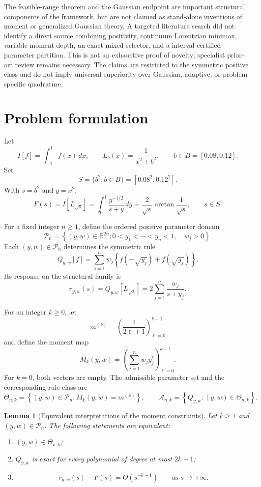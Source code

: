 \documentclass[preprint,12pt]{elsarticle}
\newtheorem{lemma}[theorem]{Lemma}
\theoremstyle{remark}
\begin{document}
The feasible-range theorem and the Gaussian endpoint are important
structural components of the framework, but are not claimed as
stand-alone inventions of moment or generalized Gaussian theory. A
targeted literature search did not identify a direct source combining
positivity, continuum Lorentzian minimax, variable moment depth, an exact
mixed selector, and a interval-certified parameter partition. This is not an
exhaustive proof of novelty; specialist prior-art review remains
necessary. The claims are restricted to the symmetric positive class
and do not imply universal superiority over Gaussian, adaptive, or
problem-specific quadrature.

\section{Problem formulation}

Let
\[
I[f]=\int_{-1}^{1} f(x)\,dx,
\qquad
L_b(x)=\frac{1}{x^2+b^2},
\qquad
b\in B=[0.08,0.12].
\]
Set
\[
S=\{b^2:b\in B\}=[0.08^2,0.12^2].
\]
With \(s=b^2\) and \(y=x^2\),
\[
F(s)=I[L_{\sqrt{s}}]
=\int_0^1\frac{y^{-1/2}}{s+y}\,dy
=\frac{2}{\sqrt{s}}\arctan\frac{1}{\sqrt{s}},
\qquad s\in S.
\]

For a fixed integer \(n\geq1\), define the ordered positive parameter
domain
\[
\mathcal P_n
=
\left\{
(y,w)\in\mathbb R^{2n}:
0<y_1<\cdots<y_n<1,\quad w_j>0
\right\}.
\]
Each \((y,w)\in\mathcal P_n\) determines the symmetric rule
\[
Q_{y,w}[f]
=
\sum_{j=1}^{n}w_j
\left\{
f(-\sqrt{y_j})+f(\sqrt{y_j})
\right\}.
\]
Its response on the structural family is
\[
r_{y,w}(s)
=
Q_{y,w}[L_{\sqrt{s}}]
=
2\sum_{j=1}^{n}\frac{w_j}{s+y_j}.
\]

For an integer \(k\geq0\), let
\[
m^{(k)}
=
\left(\frac{1}{2\ell+1}\right)_{\ell=0}^{k-1}
\]
and define the moment map
\[
M_k(y,w)
=
\left(
\sum_{j=1}^{n}w_jy_j^\ell
\right)_{\ell=0}^{k-1}.
\]
For \(k=0\), both vectors are empty. The admissible parameter set and
the corresponding rule class are
\[
\Theta_{n,k}
=
\left\{
(y,w)\in\mathcal P_n:
M_k(y,w)=m^{(k)}
\right\},
\qquad
\mathcal A_{n,k}
=
\left\{
Q_{y,w}:(y,w)\in\Theta_{n,k}
\right\}.
\]

\begin{lemma}[Equivalent interpretations of the moment constraints]
Let \(k\geq1\) and \((y,w)\in\mathcal P_n\). The following statements
are equivalent:
\begin{enumerate}[label=(\alph*)]
\item \((y,w)\in\Theta_{n,k}\);
\item \(Q_{y,w}\) is exact for every polynomial of degree at most
\(2k-1\);
\item
\[
r_{y,w}(s)-F(s)=O(s^{-k-1})
\qquad
\text{as }s\to+\infty.
\]
\end{enumerate}
\end{lemma}
\end{document}
